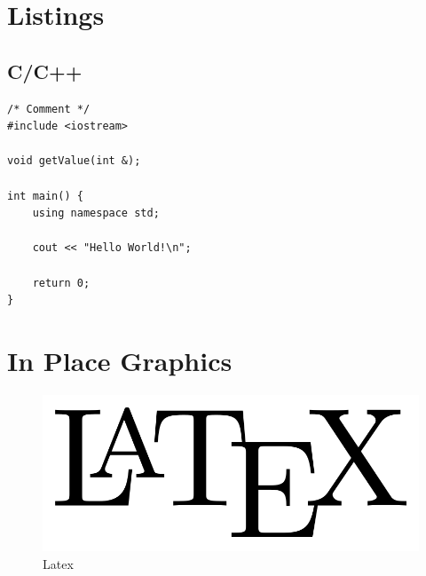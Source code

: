 \documentclass{swddoc}
\begin{document}
\section{Listings}

\subsection{C/C++}

\begin{lstlisting}[style=swd_cpp_lst_style]
/* Comment */
#include <iostream>

void getValue(int &);

int main() {
	using namespace std;

	cout << "Hello World!\n";
	
	return 0;
}
\end{lstlisting}

\section{In Place Graphics}
\begin{figure}[H]
\includegraphics[scale=0.3]{img/LaTeX-logo.png} 
\centering
\caption{Latex}
\end{figure}
\end{document}
